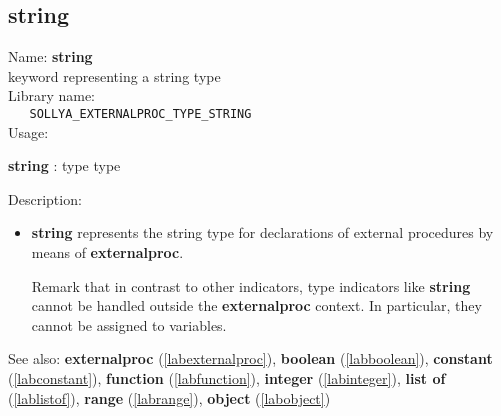 \subsection{string}
\label{labstring}
\noindent Name: \textbf{string}\\
\phantom{aaa}keyword representing a \textsf{string} type \\[0.2cm]
\noindent Library name:\\
\verb|   SOLLYA_EXTERNALPROC_TYPE_STRING|\\[0.2cm]
\noindent Usage: 
\begin{center}
\textbf{string} : \textsf{type type}\\
\end{center}
\noindent Description: \begin{itemize}

\item \textbf{string} represents the \textsf{string} type for declarations
   of external procedures by means of \textbf{externalproc}.
    
   Remark that in contrast to other indicators, type indicators like
   \textbf{string} cannot be handled outside the \textbf{externalproc} context.  In
   particular, they cannot be assigned to variables.
\end{itemize}
See also: \textbf{externalproc} (\ref{labexternalproc}), \textbf{boolean} (\ref{labboolean}), \textbf{constant} (\ref{labconstant}), \textbf{function} (\ref{labfunction}), \textbf{integer} (\ref{labinteger}), \textbf{list of} (\ref{lablistof}), \textbf{range} (\ref{labrange}), \textbf{object} (\ref{labobject})
